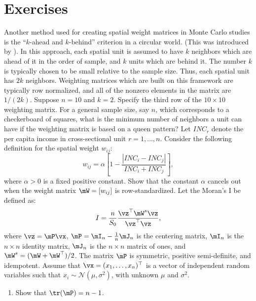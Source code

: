 \documentclass[english,12pt]{book}\usepackage[]{graphicx}\usepackage[]{xcolor}
\begin{document}
\section{Exercises}

\begin{exercises}
 \exercise Another method used for creating spatial weight matrices in Monte Carlo studies is the ``$k$-ahead and $k$-behind'' criterion in a circular world. (This was introduced by \cite{kelejian1999generalized}). In this approach, each spatial unit is assumed to have $k$ neighbors which are ahead of it in the order of sample, and $k$ units which are behind it. The number $k$ is typically chosen to be small relative to the sample size. Thus, each spatial unit has $2k$ neighbors. Weighting matrices which are built on this framework are typically row normalized, and all of the nonzero elements in the matrix are $1/(2k)$. Suppose $n =10$ and $k =2$. Specify the third row of the $10\times 10$ weighting matrix.\label{exercise:k-ahead}
 \exercise For a general sample size, say $n$, which corresponds to a checkerboard of squares, what is the minimum number of neighbors a unit can have if the weighting matrix is based on a queen pattern?
 \exercise  Let $INC_r$ denote the per capita income in cross-sectional unit $r = 1, \ldots, n$. Consider the following definition for the spatial weight $w_{ij}$:
	\begin{equation*}
	w_{ij}= \alpha\left[1 - \frac{\left|INC_i - INC_j\right|}{INC_i+ INC_j}\right], 
	\end{equation*}
	where $\alpha > 0$ is a fixed positive constant. Show that the constant $\alpha$ cancels out when the weight matrix $\mW = [w_{ij}]$ is row-standardized.
	\exercise Let the Moran's I be defined as:
	 \begin{equation*}
	 I = \frac{n}{S_0}\frac{\vz^\top\mW^s\vz}{\vz^\top\vz},
	 \end{equation*}
	 where $\vz = \mP\vx$, $\mP = \mI_n - \frac{1}{n}\mJ_n$ is the centering matrix, $\mI_n$ is the $n \times n$ identity matrix, $\mJ_n$ is the $n \times n$ matrix of ones, and $\mW^s = (\mW + \mW^\top)/2$. The matrix $\mP$ is symmetric, positive semi-definite, and idempotent. Assume that $\vx = (x_1, \ldots, x_n)^\top$ is a vector of independent random variables such that $x_i \sim \mathcal{N}(\mu, \sigma^2)$, with unknown $\mu$ and $\sigma^2$.
	 \begin{enumerate}
	  \item Show that $\tr(\mP) = n - 1$.

\end{enumerate}
\end{exercises}
\end{document}
